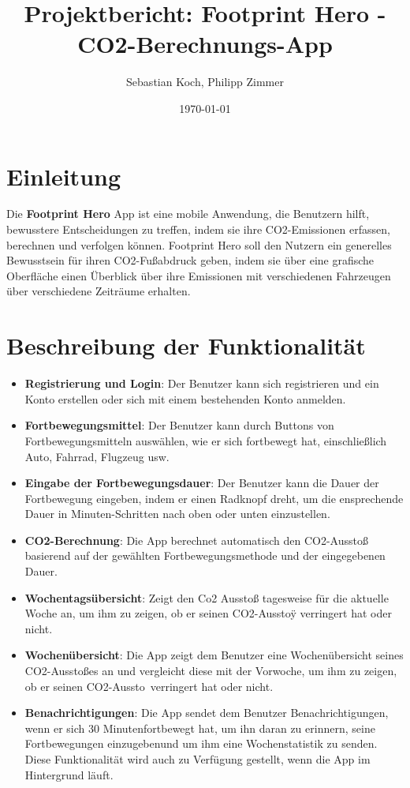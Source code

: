 \documentclass{article}
\title{Projektbericht: Footprint Hero - CO2-Berechnungs-App}
\author{Sebastian Koch, Philipp Zimmer}
\date{\today}
\begin{document}
\maketitle


\section{Einleitung}
Die \textbf{Footprint Hero} App ist eine mobile Anwendung, die Benutzern hilft, bewusstere Entscheidungen zu treffen, indem sie ihre CO2-Emissionen erfassen, berechnen und verfolgen können. Footprint Hero soll den Nutzern ein generelles Bewusstsein für ihren CO2-Fußabdruck geben, indem sie über eine grafische Oberfläche einen Überblick über ihre Emissionen mit verschiedenen Fahrzeugen über verschiedene Zeiträume erhalten.

\section{Beschreibung der Funktionalität}
\begin{itemize}
	\item \textbf{Registrierung und Login}:
	Der Benutzer kann sich registrieren und ein Konto erstellen oder sich mit einem bestehenden Konto anmelden.
	\item  \textbf{Fortbewegungsmittel}:
	Der Benutzer kann durch Buttons von Fortbewegungsmitteln auswählen, wie er sich fortbewegt hat, einschließlich Auto, Fahrrad, Flugzeug usw.
	\item \textbf{Eingabe der Fortbewegungsdauer}:
	Der Benutzer kann die Dauer der Fortbewegung eingeben, indem er einen Radknopf dreht, um die ensprechende Dauer in Minuten-Schritten nach oben oder unten einzustellen.
	\item \textbf{CO2-Berechnung}:
	Die App berechnet automatisch den CO2-Ausstoß basierend auf der gewählten Fortbewegungsmethode und der eingegebenen Dauer.
	\item \textbf{Wochentagsübersicht}:
	Zeigt den Co2 Ausstoß tagesweise für die aktuelle Woche an, um ihm zu zeigen, ob er seinen CO2-Ausstoÿ verringert hat oder nicht.
	\item \textbf{Wochenübersicht}:
	Die App zeigt dem Benutzer eine Wochenübersicht seines CO2-Ausstoßes an und vergleicht diese mit der Vorwoche, um ihm zu zeigen, ob er seinen CO2-Aussto\ verringert hat oder nicht.
	\item \textbf{Benachrichtigungen}:
	Die App sendet dem Benutzer Benachrichtigungen, wenn er sich 30 Minutenfortbewegt hat, um ihn daran zu erinnern, seine Fortbewegungen einzugebenund um ihm eine Wochenstatistik zu senden. Diese Funktionalität wird auch zu Verfügung gestellt, wenn die App im Hintergrund läuft.
	\end{itemize}
\end{document}
